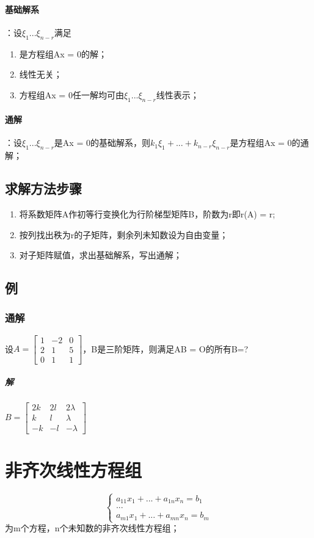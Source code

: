 \paragraph{基础解系}
：设\(\xi_1...\xi_{n - r}\)满足\begin{enumerate}
    \item 是方程组Ax = 0的解；
    \item 线性无关；
    \item 方程组Ax = 0任一解均可由\(\xi_1...\xi_{n - r}\)线性表示；
\end{enumerate}

\paragraph{通解}
：设\(\xi_1...\xi_{n - r}\)是Ax = 0的基础解系，则\(k_1\xi_1 + ... + k_{n - r}\xi_{n - r}\)是方程组Ax = 0的通解；

\subsection{求解方法步骤}
\begin{enumerate}
    \item 将系数矩阵A作初等行变换化为行阶梯型矩阵B，阶数为r即r(A) = r;
    \item 按列找出秩为r的子矩阵，剩余列未知数设为自由变量；
    \item 对子矩阵赋值，求出基础解系，写出通解；
\end{enumerate}


\subsection{例}

\subsubsection{通解}
设\(A = \begin{bmatrix}
    1 & -2 & 0 \\ 
    2 & 1 & 5 \\ 
    0 & 1 & 1
\end{bmatrix}\)，B是三阶矩阵，则满足AB = O的所有B=?
\subparagraph{解}
\(B = \begin{bmatrix}
    2k & 2l & 2\lambda \\ 
    k & l & \lambda \\ 
    -k & -l & -\lambda
\end{bmatrix}\)


\section{非齐次线性方程组}
\[
\begin{cases}
a_{11}x_1 + ... + a_{1n}x_n = b_1 \\ 
... \\ 
a_{m1}x_1 + ... + a_{mn}x_n = b_m
\end{cases}
\]为m个方程，n个未知数的非齐次线性方程组；


